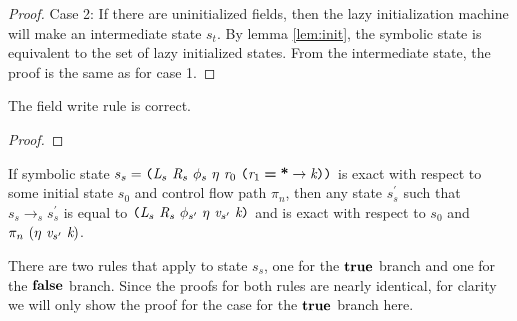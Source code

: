 \begin{proof}
Case 2: If there are uninitialized fields, then the lazy initialization machine will make an intermediate state $s_t$. By lemma \ref{lem:init}, the symbolic state is equivalent to the set of lazy initialized states. From the intermediate state, the proof is the same as for case 1.
\end{proof}

\begin{lemma}
The field write rule is correct.
\end{lemma}
\begin{proof}
\end{proof}

\begin{lemma}
If symbolic state $s_s =  \lp \cfgnt{L}_s\ \cfgnt{R}_s\ \phi_s\ \eta\ \cfgnt{r}_0\ \lp \cfgnt{r}_1\; \cfgt{=}\; \cfgt{*} \rightarrow \cfgnt{k}\rp \rp$ is exact with respect to some initial state $s_0$ and control flow path $\pi_n$, then any state $s_s^\prime$ such that $s_s \rightarrow_s s_s^\prime$ is equal to $ \lp \cfgnt{L}_s\ \cfgnt{R}_s\ \phi_{s^\prime}\ \eta\ \cfgnt{v}_{s^\prime}\ \cfgnt{k}\rp$ and is exact with respect to $s_0$ and $\pi_n \ (\eta\ \cfgnt{v}_{s^\prime}\ \cfgnt{k})$.
\end{lemma}
There are two rules that apply to state $s_s$, one for the $\textbf{true}$ branch and one for the $\textbf{false}$ branch. Since the proofs for both rules are nearly identical, for clarity we will only show the proof for the case for the $\textbf{true}$ branch here. 
